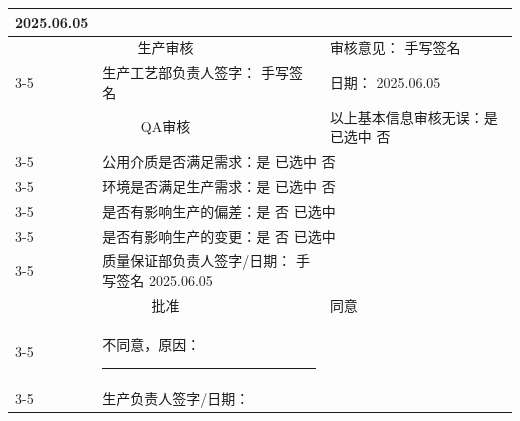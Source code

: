 \documentclass[UTF8,10pt,a4paper,fontset=fandol]{ctexart}
\newcommand{\fieldvalue}[1]{#1}
\newcommand{\handwritten}[1]{#1}
\begin{document}
\begin{tabularx}{\textwidth}{|p{2.2cm}|p{2.7cm}|X|p{2.7cm}|X|}
\fieldvalue{\handwritten{2025.06.05}}
& \\
\hline
\multicolumn{2}{|c|}{生产审核} &
审核意见：
\fieldvalue{\handwritten{手写签名}}
&
\multicolumn{2}{c|}{} \\
\cline{3-5}
\multicolumn{2}{|c|}{} &
生产工艺部负责人签字：
\fieldvalue{\handwritten{手写签名}}
&
日期：
\fieldvalue{\handwritten{2025.06.05}}
& \\
\hline
\multicolumn{2}{|c|}{QA审核} &
\multicolumn{3}{l|}{以上基本信息审核无误：是
\fieldvalue{已选中}
\quad 否} \\
\cline{3-5}
\multicolumn{2}{|c|}{} &
\multicolumn{3}{l|}{公用介质是否满足需求：是
\fieldvalue{已选中}
\quad 否} \\
\cline{3-5}
\multicolumn{2}{|c|}{} &
\multicolumn{3}{l|}{环境是否满足生产需求：是
\fieldvalue{已选中}
\quad 否} \\
\cline{3-5}
\multicolumn{2}{|c|}{} &
\multicolumn{3}{l|}{是否有影响生产的偏差：是 \quad 否
\fieldvalue{已选中}} \\
\cline{3-5}
\multicolumn{2}{|c|}{} &
\multicolumn{3}{l|}{是否有影响生产的变更：是 \quad 否
\fieldvalue{已选中}} \\
\cline{3-5}
\multicolumn{2}{|c|}{} &
质量保证部负责人签字/日期：
\fieldvalue{\handwritten{手写签名}}
\quad
\fieldvalue{\handwritten{2025.06.05}}
& \\
\hline
\multicolumn{2}{|c|}{批准} &
\fieldvalue{同意} \\
\cline{3-5}
\multicolumn{2}{|c|}{} &
不同意，原因：\rule{5cm}{0.4pt}
& \multicolumn{2}{c|}{} \\
\cline{3-5}
\multicolumn{2}{|c|}{} &
生产负责人签字/日期：

\end{tabularx}
\end{document}
